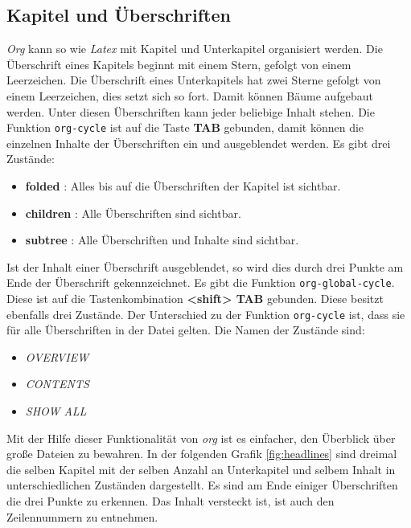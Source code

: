 \subsection{Kapitel und Überschriften}
\label{subsec:kapitel}
\textit{Org} kann so wie \textit{Latex} mit Kapitel und
       {\glqq}Unterkapitel{\grqq} organisiert werden. Die Überschrift
       eines Kapitels beginnt mit einem Stern, gefolgt von einem
       Leerzeichen. Die Überschrift eines Unterkapitels hat zwei
       Sterne gefolgt von einem Leerzeichen, dies setzt sich so
       fort. Damit können {\glqq}Bäume{\grqq} aufgebaut werden. Unter
       diesen Überschriften kann jeder beliebige Inhalt stehen. Die
       Funktion \texttt{org-cycle} ist auf die Taste \textbf{TAB}
       gebunden, damit können die einzelnen Inhalte der Überschriften
       ein und ausgeblendet werden. Es gibt drei Zustände:
\begin{itemize}
\item \textbf{folded} : Alles bis auf die Überschriften der Kapitel
  ist sichtbar.
\item \textbf{children} : Alle Überschriften sind sichtbar.
\item \textbf{subtree} : Alle Überschriften und Inhalte sind sichtbar.
\end{itemize}
Ist der Inhalt einer Überschrift ausgeblendet, so wird dies durch drei
Punkte am Ende der Überschrift gekennzeichnet. Es gibt die Funktion
\texttt{org-global-cycle}. Diese ist auf die Tastenkombination
\textbf{<shift> TAB} gebunden. Diese besitzt ebenfalls drei
Zustände. Der Unterschied zu der Funktion \texttt{org-cycle} ist, dass
sie für alle Überschriften in der Datei gelten. Die Namen der Zustände
sind:
\begin{itemize}
\item \textit{OVERVIEW}
\item \textit{CONTENTS}
\item \textit{SHOW ALL}
\end{itemize}
Mit der Hilfe dieser Funktionalität von \textit{org} ist es einfacher,
den Überblick über große Dateien zu bewahren. In der folgenden Grafik
\ref{fig:headlines} sind dreimal die selben Kapitel mit der selben
Anzahl an Unterkapitel und selbem Inhalt in unterschiedlichen
Zuständen dargestellt. Es sind am Ende einiger Überschriften die drei
Punkte zu erkennen. Das Inhalt versteckt ist, ist auch den
Zeilennummern zu entnehmen.\\


